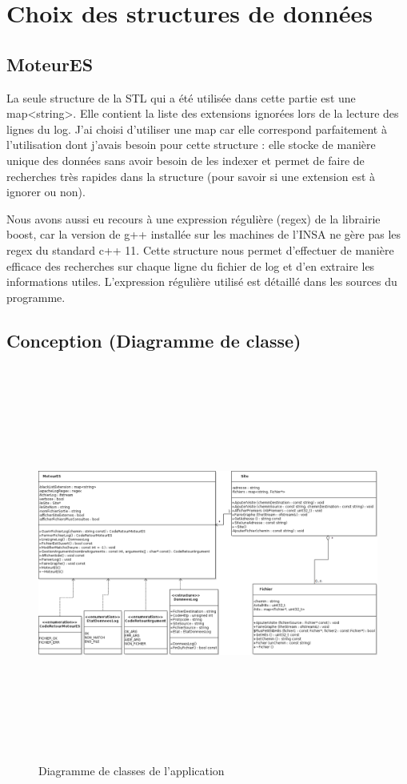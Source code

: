 \documentclass[11pt]{article}
\begin{document}
\section{Choix des structures de données}
\subsection{MoteurES}
La seule structure de la STL qui a été utilisée dans cette partie est une map<string>. Elle contient la liste des extensions ignorées lors de la lecture des lignes du log. J'ai choisi d'utiliser une map car elle correspond parfaitement à l'utilisation dont j'avais besoin pour cette structure : elle stocke de manière unique des données sans avoir besoin de les indexer et permet de faire de recherches très rapides dans la structure (pour savoir si une extension est à ignorer ou non).

Nous avons aussi eu recours à une expression régulière (regex) de la librairie boost, car la version de g++ installée sur les machines de l'INSA ne gère pas les regex du standard c++ 11. Cette structure nous permet d'effectuer de manière efficace des recherches sur chaque ligne du fichier de log et d'en extraire les informations utiles. L'expression régulière utilisé est détaillé dans les sources du programme.

\newpage
{}
\begin{landscape}\center
\section{Conception (Diagramme de classe)}
\begin{figure}[b!]
\centering
\includegraphics[height=13cm,keepaspectratio]{uml.png}
\caption{Diagramme de classes de l'application}
\label{fig:my_label}
\end{figure}
\end{landscape}
\restoregeometry
\end{document}
